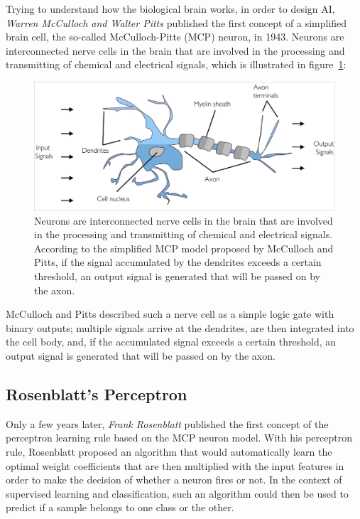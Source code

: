 \documentclass[11pt]{article}
\begin{document}
    Trying to understand how the biological brain works, in order to design AI, \textit{Warren McCulloch and Walter Pitts} published the first concept of a simplified brain cell, the so-called McCulloch-Pitts (MCP) neuron, in 1943\cite{McCulloch1990a}.
    Neurons are interconnected nerve cells in the brain that are involved in the processing and transmitting of chemical and electrical signals, which is illustrated in figure~\ref{fig:neuron}:

    \begin{figure}[hbt!]
        \centering
        \includegraphics[width=1\linewidth,trim=0.5 0.5 0.5 0.5,clip]{img/neuron.jpg}
        \caption{Neurons are interconnected nerve cells in the brain that are involved in the processing and transmitting of chemical and electrical signals.
        According to the simplified MCP model proposed by McCulloch and Pitts, if the signal accumulated by the dendrites exceeds a certain threshold, an output signal is generated that will be passed on by the axon.}
        \label{fig:neuron}
    \end{figure}

    McCulloch and Pitts described such a nerve cell as a simple logic gate with binary outputs;
    multiple signals arrive at the dendrites, are then integrated into the cell body, and, if the accumulated signal exceeds a certain threshold, an output signal is generated that will be passed on by the axon.

    \subsection{Rosenblatt's Perceptron} \label{subsec:perceptron}

    Only a few years later, \textit{Frank Rosenblatt} published the first concept of the perceptron learning rule based on the MCP neuron model\cite{Rosenblatt1957a}.
    With his perceptron rule, Rosenblatt proposed an algorithm that would automatically learn the optimal weight coefficients that are then multiplied with the input features in order to make the decision of whether a neuron fires or not.
    In the context of supervised learning and classification, such an algorithm could then be used to predict if a sample belongs to one class or the other.
\end{document}
